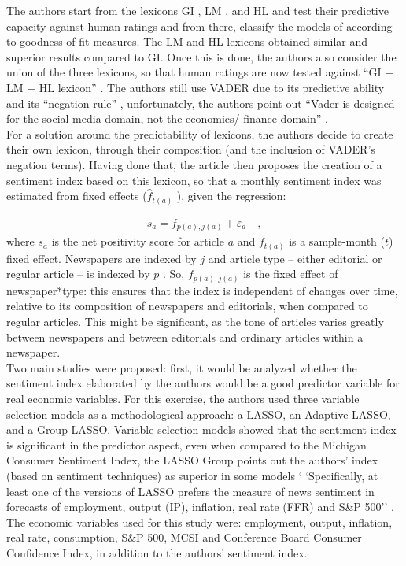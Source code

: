 The authors start from the lexicons GI \cite[]{heston2017news}, LM \cite[]{loughran2011liability}, and HL \cite[]{hu2004mining} and test their predictive capacity against human ratings and from there, classify the models of according to goodness-of-fit measures. The LM and HL lexicons obtained similar and superior results compared to GI. Once this is done, the authors also consider the union of the three lexicons, so that human ratings are now tested against ``GI + LM + HL lexicon'' \cite[p. 13]{shapiro2020measuring}. The authors still use VADER \cite[]{hutto2014vader} due to its predictive ability and its ``negation rule'' \cite[]{potts2010negativity}, unfortunately, the authors point out ``Vader is designed for the social-media domain, not the
economics/ finance domain'' \cite[p. 14]{shapiro2020measuring}.\\

For a solution around the predictability of lexicons, the authors decide to create their own lexicon, through their composition (and the inclusion of VADER's negation terms). Having done that, the article then proposes the creation of a sentiment index based on this lexicon, so that a monthly sentiment index was estimated from fixed effects ($\hat{f}_{t(a)}$ ), given the regression:

\begin{align*}
    s_a = f_{p(a), j(a)} + \varepsilon_a \quad ,
\end{align*}
where $s_a$ is the net positivity score for article $a$ and $f_{t(a)}$ is a sample-month ($t$) fixed effect. Newspapers are indexed by $j$ and article type -- either editorial or regular article -- is indexed by $p$ \cite[p. 20]{shapiro2020measuring}. So, $f_{p(a), j(a)}$ is the fixed effect of newspaper*type: this ensures that the index is independent of changes over time, relative to its composition of newspapers and editorials, when compared to regular articles. This might be significant, as the tone of articles varies greatly between newspapers and between editorials and ordinary articles within a newspaper.\\

Two main studies were proposed: first, it would be analyzed whether the sentiment index elaborated by the authors would be a good predictor variable for real economic variables. For this exercise, the authors used three variable selection models as a methodological approach: a LASSO, an Adaptive LASSO, and a Group LASSO. Variable selection models showed that the sentiment index is significant in the predictor aspect, even when compared to the Michigan Consumer Sentiment Index, the LASSO Group points out the authors' index (based on sentiment techniques) as superior in some models ` `Specifically, at least one of the versions of LASSO prefers the measure of news sentiment in forecasts of employment, output (IP), inflation, real rate (FFR) and S\&P 500'' \cite[p. 26]{shapiro2020measurement}. The economic variables used for this study were: employment, output, inflation, real rate, consumption, S\&P 500, MCSI and Conference Board Consumer Confidence Index, in addition to the authors' sentiment index.\\

